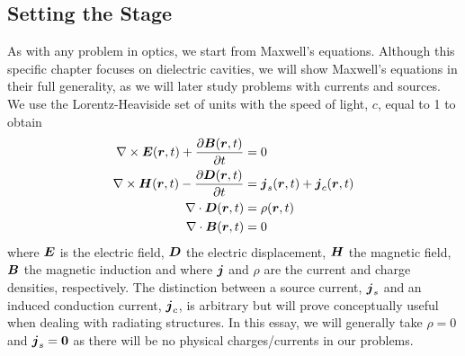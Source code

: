 \subsection{Setting the Stage}
As with any problem in optics, we start from Maxwell's equations. Although 
this specific chapter focuses on dielectric cavities, we will show Maxwell's equations
in their full generality, as we will later study problems with currents and sources. 
We use the Lorentz-Heaviside set of units with the speed of light, $c$, equal to 1
to obtain \cite{NOV2012} 
  \begin{subequations}
  \label{eq:passive.formalism.maxwellsEquations}
  \begin{align}
   \nabla\times\boldsymbol{E}(\boldsymbol{r},t)+\frac{\partial\boldsymbol{B}(\boldsymbol{r},t)}{\partial t}	&=0			\\
   \nabla\times\boldsymbol{H}(\boldsymbol{r},t)-\frac{\partial\boldsymbol{D}(\boldsymbol{r},t)}{\partial t}	&=\boldsymbol{j}_s(\boldsymbol{r},t)+\boldsymbol{j}_c(\boldsymbol{r},t)	\\
   \nabla\cdot\boldsymbol{D}(\boldsymbol{r},t)							&=\rho(\boldsymbol{r},t)			\\
   \nabla\cdot\boldsymbol{B}(\boldsymbol{r},t)							&=0
  \end{align}
  \end{subequations}
where $\boldsymbol{E}$ is the electric field, $\boldsymbol{D}$ the electric displacement, $\boldsymbol{H}$
the magnetic field, $\boldsymbol{B}$ the magnetic induction and where 
$\boldsymbol{j}$ and $\rho$ are the current and charge densities, respectively. 
The distinction between a source current, $\boldsymbol{j}_s$ and an induced conduction
current, $\boldsymbol{j}_c$, is arbitrary but will prove conceptually useful when dealing
with radiating structures.
In this essay, we will generally take $\rho=0$ and $\boldsymbol{j}_s=\boldsymbol{0}$
as there will be no physical charges/currents in our problems.

